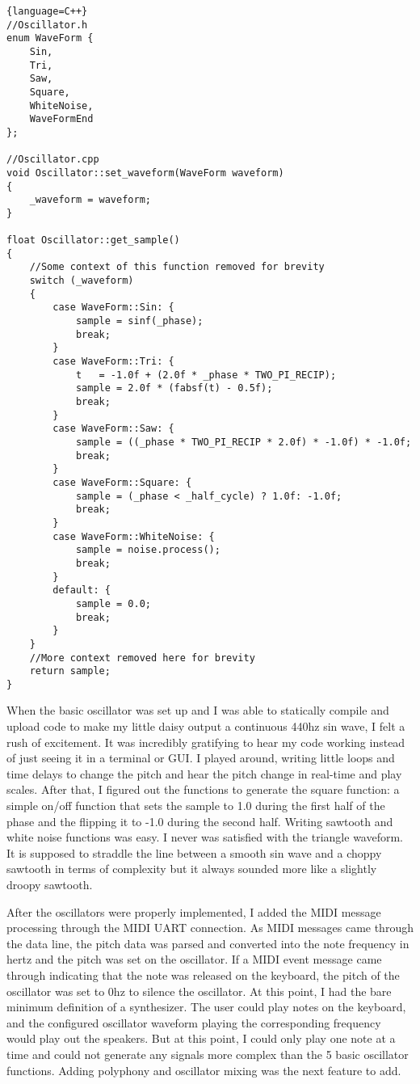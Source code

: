 \documentclass[acmlarge,screen]{acmart}
\begin{document}
\begin{lstlisting}{language=C++}
//Oscillator.h
enum WaveForm {
	Sin,
	Tri,
	Saw,
	Square,
	WhiteNoise,
	WaveFormEnd
};

//Oscillator.cpp
void Oscillator::set_waveform(WaveForm waveform)
{
	_waveform = waveform;
}

float Oscillator::get_sample()
{
	//Some context of this function removed for brevity
	switch (_waveform)
	{
		case WaveForm::Sin: {
			sample = sinf(_phase);
			break;
		}
		case WaveForm::Tri: {
			t   = -1.0f + (2.0f * _phase * TWO_PI_RECIP);
			sample = 2.0f * (fabsf(t) - 0.5f);
			break;
		}
		case WaveForm::Saw: {
			sample = ((_phase * TWO_PI_RECIP * 2.0f) * -1.0f) * -1.0f;
			break;
		}
		case WaveForm::Square: {
			sample = (_phase < _half_cycle) ? 1.0f: -1.0f;
			break;
		}
		case WaveForm::WhiteNoise: {
			sample = noise.process();
			break;
		}
		default: {
			sample = 0.0;
			break;
		}
	}
	//More context removed here for brevity
	return sample;
}
\end{lstlisting}

When the basic oscillator was set up and I was able to statically compile and upload code to make my little daisy output a continuous 440hz sin wave, I felt a rush of excitement. It was incredibly gratifying to hear my code working instead of just seeing it in a terminal or GUI. I played around, writing little loops and time delays to change the pitch and hear the pitch change in real-time and play scales. After that, I figured out the functions to generate the square function: a simple on/off function that sets the sample to 1.0 during the first half of the phase and the flipping it to -1.0 during the second half. Writing sawtooth and white noise functions was easy. I never was satisfied with the triangle waveform. It is supposed to straddle the line between a smooth sin wave and a choppy sawtooth in terms of complexity but it always sounded more like a slightly droopy sawtooth.

After the oscillators were properly implemented, I added the MIDI message processing through the MIDI UART connection. As MIDI messages came through the data line, the pitch data was parsed and converted into the note frequency in hertz and the pitch was set on the oscillator. If a MIDI event message came through indicating that the note was released on the keyboard, the pitch of the oscillator was set to 0hz to silence the oscillator. At this point, I had the bare minimum definition of a synthesizer. The user could play notes on the keyboard, and the configured oscillator waveform playing the corresponding frequency would play out the speakers. But at this point, I could only play one note at a time and could not generate any signals more complex than the 5 basic oscillator functions. Adding polyphony and oscillator mixing was the next feature to add.
\end{document}
